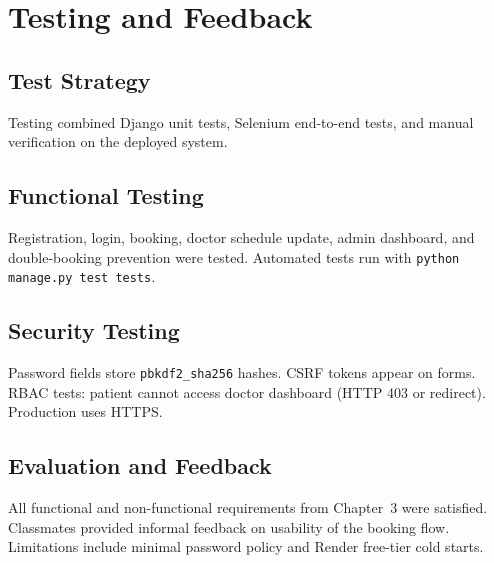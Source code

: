 \chapter{Testing and Feedback}

\section{Test Strategy}

Testing combined Django unit tests, Selenium end-to-end tests, and manual verification on the deployed system.

\section{Functional Testing}

Registration, login, booking, doctor schedule update, admin dashboard, and double-booking prevention were tested. Automated tests run with \texttt{python manage.py test tests}.

\section{Security Testing}

Password fields store \texttt{pbkdf2\_sha256} hashes. CSRF tokens appear on forms. RBAC tests: patient cannot access doctor dashboard (HTTP 403 or redirect). Production uses HTTPS.

\section{Evaluation and Feedback}

All functional and non-functional requirements from Chapter~3 were satisfied. Classmates provided informal feedback on usability of the booking flow. Limitations include minimal password policy and Render free-tier cold starts.
